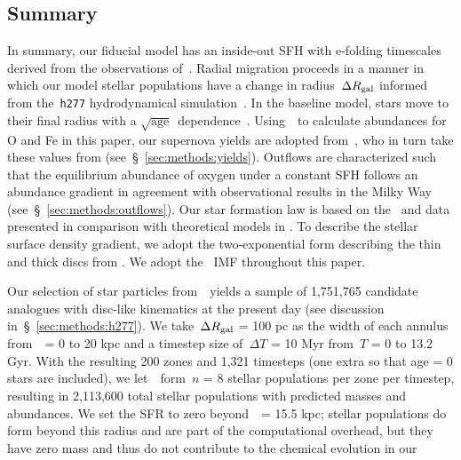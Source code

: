 \documentclass[draft2.tex]{subfiles}
\begin{document}
\subsection{Summary} 
\label{sec:methods:summary} 
In summary, our fiducial model has an inside-out SFH with e-folding timescales 
derived from the observations of~\citet[][see discussion 
in~\S~\ref{sec:methods:sfhs}]{Sanchez2020}. 
Radial migration proceeds in a manner in which our model stellar populations 
have a change in radius~$\Delta R_\text{gal}$ informed from the~\texttt{h277} 
hydrodynamical simulation~\citep[][see discussion 
in~\S~\ref{sec:methods:h277}]{Christensen2012, Zolotov2012, Loebman2012, 
Loebman2014, Brooks2014}. 
In the baseline model, stars move to their final radius with a 
$\sqrt{\text{age}}$~dependence~\citep[][see discussion in 
\ref{sec:methods:migration}]{Frankel2018,Frankel2020}. 
Using~\vice~to calculate abundances for O and Fe in this paper, our supernova 
yields are adopted from~\citet{Johnson2020}, who in turn take these values from 
\citet{Weinberg2017} (see~\S~\ref{sec:methods:yields}). 
Outflows are characterized such that the equilibrium abundance of oxygen under 
a constant SFH follows an abundance gradient in agreement with observational 
results in the Milky Way (see~\S~\ref{sec:methods:outflows}). 
Our star formation law is based on the~\citet{Bigiel2010} and 
\citet{Leroy2013} data presented in comparison with theoretical models in 
\citet[][see~\S~\ref{sec:methods:sfe}]{Krumholz2018a}. 
To describe the stellar surface density gradient, we adopt the two-exponential 
form describing the thin and thick discs from 
\citet[][see~\S~\ref{sec:methods:surface_density_gradient}]{Bland-Hawthorn2016}. 
We adopt the~\citet{Kroupa2001} IMF throughout this paper. 
\par 
Our selection of star particles from~\hsim~yields a sample of 1,751,765 
candidate analogues with disc-like kinematics at the present day (see 
discussion in~\S~\ref{sec:methods:h277}). 
We take~$\Delta R_\text{gal}$ = 100 pc as the width of each annulus from~\rgal~= 0 to 
20 kpc and a timestep size of~$\Delta T$ = 10 Myr from~$T$ = 0 to 13.2 Gyr. 
With the resulting 200 zones and 1,321 timesteps (one extra so that age = 0 
stars are included), we let~\vice~form~$n$ = 8 stellar populations per zone per 
timestep, resulting in 2,113,600 total stellar populations with predicted 
masses and abundances. 
We set the SFR to zero beyond~\rgal~= 15.5 kpc; stellar populations 
do form beyond this radius and are part of the computational overhead, but they 
have zero mass and thus do not contribute to the chemical evolution in our 
\end{document}
